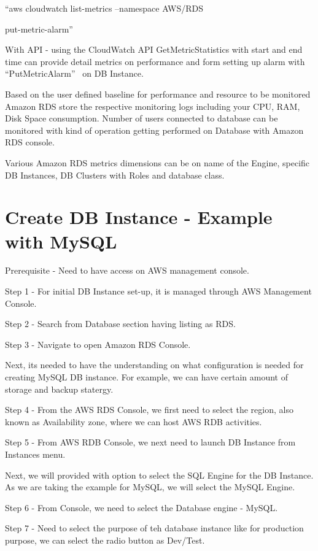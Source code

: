 \begin{Abstract}
``aws cloudwatch list-metrics --namespace AWS/RDS

put-metric-alarm''~\cite{hid-sp18-520-amardsmon}

With API - using the CloudWatch API GetMetricStatistics with start and end time 
can provide detail metrics on performance and form setting up alarm 
with ``PutMetricAlarm''~\cite{hid-sp18-520-amardsmon} on DB Instance.

Based on the user defined baseline for performance and resource to be monitored 
Amazon RDS store the respective monitoring logs including your CPU, RAM, Disk 
Space consumption.
Number of users connected to database can be monitored with kind of operation 
getting performed on Database with Amazon RDS console.  

Various Amazon RDS metrics dimensions can be on name of the Engine, specific 
DB Instances, DB Clusters with Roles and database class.

\section{Create DB Instance - Example with MySQL}

Prerequisite - Need to have access on AWS management console.

Step 1 - For initial DB Instance set-up, it is managed through AWS Management
Console.

Step 2 - Search from Database section having listing as RDS.

Step 3 - Navigate to open Amazon RDS Console.

Next, its needed to have the understanding on what configuration is needed 
for creating MySQL DB instance. For example, we can have certain amount of 
storage and backup statergy.

Step 4  - From the AWS RDS Console, we first need to select the region, also 
known as Availability zone, where we can host AWS RDB activities.

Step 5 - From AWS RDB Console, we next need to launch DB Instance from 
Instances menu.

Next, we will provided with option to select the SQL Engine for the DB 
Instance. As we are taking the example for MySQL, we will select the 
MySQL Engine.

Step 6 - From Console, we need to select the Database engine - MySQL.

Step 7 - Need to select the purpose of teh database instance like for 
production purpose, we can select the radio button as Dev/Test.


\end{Abstract}
